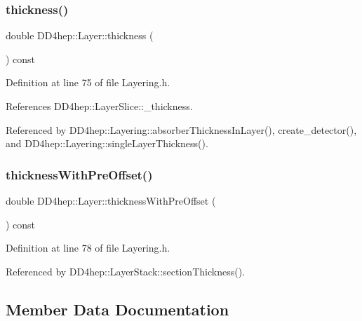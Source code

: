 \subsubsection{\texorpdfstring{thickness()}{thickness()}}
{\footnotesize\ttfamily double D\+D4hep\+::\+Layer\+::thickness (\begin{DoxyParamCaption}{ }\end{DoxyParamCaption}) const\hspace{0.3cm}{\ttfamily [inline]}}



Definition at line 75 of file Layering.\+h.



References D\+D4hep\+::\+Layer\+Slice\+::\+\_\+thickness.



Referenced by D\+D4hep\+::\+Layering\+::absorber\+Thickness\+In\+Layer(), create\+\_\+detector(), and D\+D4hep\+::\+Layering\+::single\+Layer\+Thickness().

\hypertarget{class_d_d4hep_1_1_layer_ad5a2a4de75ac3a5487fb9d2340cb815a}{}\label{class_d_d4hep_1_1_layer_ad5a2a4de75ac3a5487fb9d2340cb815a} 
\subsubsection{\texorpdfstring{thickness\+With\+Pre\+Offset()}{thicknessWithPreOffset()}}
{\footnotesize\ttfamily double D\+D4hep\+::\+Layer\+::thickness\+With\+Pre\+Offset (\begin{DoxyParamCaption}{ }\end{DoxyParamCaption}) const\hspace{0.3cm}{\ttfamily [inline]}}



Definition at line 78 of file Layering.\+h.



Referenced by D\+D4hep\+::\+Layer\+Stack\+::section\+Thickness().



\subsection{Member Data Documentation}
\hypertarget{class_d_d4hep_1_1_layer_a1160c69a0ac9822a0cc9c0c0c7ceac73}{}\label{class_d_d4hep_1_1_layer_a1160c69a0ac9822a0cc9c0c0c7ceac73} 

